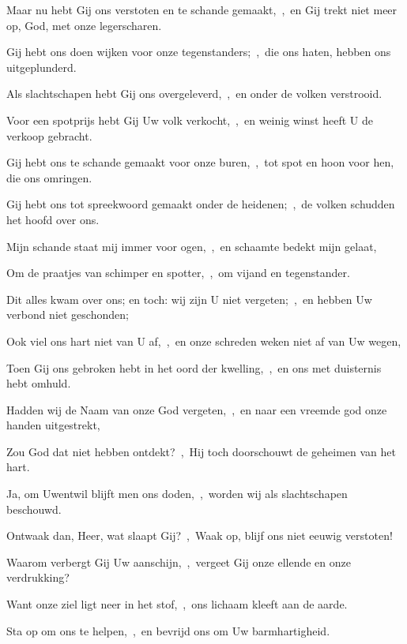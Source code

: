 \documentclass[12pt,twoside,a5paper]{article}
\begin{document}
\begin{halfparskip}
  Maar nu hebt Gij ons verstoten en te schande gemaakt,~\sep\ en Gij trekt niet meer op, God, met onze legerscharen.

  Gij hebt ons doen wijken voor onze tegenstanders;~\sep\ die ons haten, hebben ons uitgeplunderd.

  Als slachtschapen hebt Gij ons overgeleverd,~\sep\ en onder de volken verstrooid.

  Voor een spotprijs hebt Gij Uw volk verkocht,~\sep\ en weinig winst heeft U de verkoop gebracht.

  Gij hebt ons te schande gemaakt voor onze buren,~\sep\ tot spot en hoon voor hen, die ons omringen.

  Gij hebt ons tot spreekwoord gemaakt onder de heidenen;~\sep\ de volken schudden het hoofd over ons.

  Mijn schande staat mij immer voor ogen,~\sep\ en schaamte bedekt mijn gelaat,

  Om de praatjes van schimper en spotter,~\sep\ om vijand en tegenstander.
\end{halfparskip}


\begin{halfparskip}
  Dit alles kwam over ons; en toch: wij zijn U niet vergeten;~\sep\ en hebben Uw verbond niet geschonden;

  Ook viel ons hart niet van U af,~\sep\ en onze schreden weken niet af van Uw wegen,

  Toen Gij ons gebroken hebt in het oord der kwelling,~\sep\ en ons met duisternis hebt omhuld.

  Hadden wij de Naam van onze God vergeten,~\sep\ en naar een vreemde god onze handen uitgestrekt,

  Zou God dat niet hebben ontdekt?~\sep\ Hij toch doorschouwt de geheimen van het hart.

  Ja, om Uwentwil blijft men ons doden,~\sep\ worden wij als slachtschapen beschouwd.

  Ontwaak dan, Heer, wat slaapt Gij?~\sep\ Waak op, blijf ons niet eeuwig verstoten!

  Waarom verbergt Gij Uw aanschijn,~\sep\ vergeet Gij onze ellende en onze verdrukking?

  Want onze ziel ligt neer in het stof,~\sep\ ons lichaam kleeft aan de aarde.

  Sta op om ons te helpen,~\sep\ en bevrijd ons om Uw barmhartigheid.
\end{halfparskip}
\end{document}
